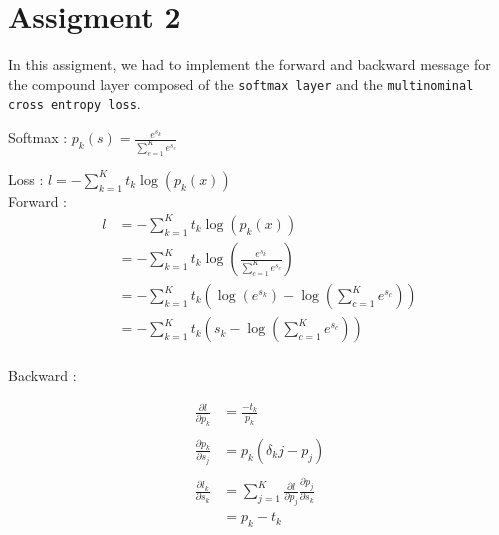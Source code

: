 \documentclass{article}
\begin{document}
\section{Assigment 2}

In this assigment, we had to implement the forward and backward message for the compound layer composed of 
the \texttt{softmax layer} and the \texttt{multinominal cross entropy loss}.

Softmax : $ p_k(s) = \frac{e^{s_k}}{\sum_{c=1}^K e^{s_c}} $

Loss : $ l = - \sum_{k=1}^K t_k \log(p_k(x)) $ \\


Forward : 
\begin{align*}
    l &= - \sum_{k=1}^K t_k \log(p_k(x)) \\
      &= - \sum_{k=1}^K t_k \log(\frac{e^{s_k}}{\sum_{c=1}^K e^{s_c}}) \\
      &= - \sum_{k=1}^K t_k (\log(e^{s_k}) - \log(\sum_{c=1}^K e^{s_c})) \\
      &= - \sum_{k=1}^K t_k (s_k - \log(\sum_{c=1}^K e^{s_c})) \\
\end{align*}

Backward :



\begin{align*}
    \frac{\partial l}{\partial p_k} &= \frac{-t_k}{p_k} \\ \\
    \frac{\partial p_k}{\partial s_j} &= p_k(\delta_kj - p_j) \\ \\
    \frac{\partial l_k}{\partial s_k} &= \sum_{j=1}^{K} \frac{\partial l}{\partial p_j} \frac{\partial p_j}{\partial s_k} \\
                                      &= p_k - t_k \\
\end{align*}
\end{document}
